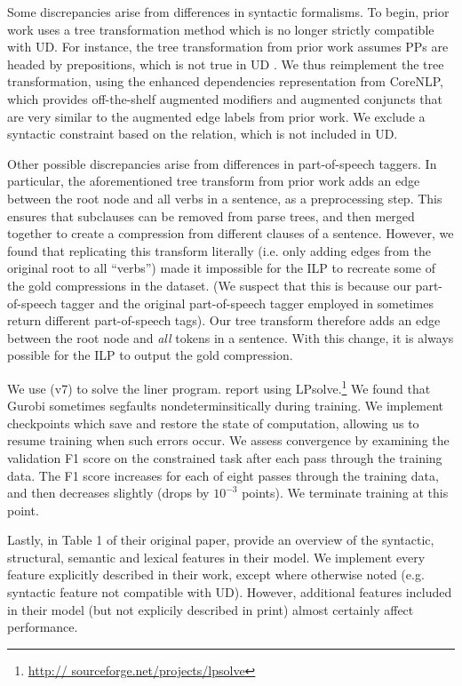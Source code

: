 Some discrepancies arise from differences in syntactic formalisms. To begin, prior work uses a tree transformation method which is no longer strictly compatible with UD. For instance, the tree transformation from prior work assumes PPs are headed by prepositions, which is not true in UD \cite{Schuster2016EnhancedEU}. We thus reimplement the tree transformation, using the enhanced dependencies representation from CoreNLP, which provides off-the-shelf augmented modifiers and augmented conjuncts that are very similar to the augmented edge labels from prior work. We exclude a syntactic constraint based on the  relation, which is not included in UD.

Other possible discrepancies arise from differences in part-of-speech taggers. In particular, the aforementioned tree transform from prior work adds an edge between the root node and all verbs in a sentence, as a preprocessing step. This ensures that subclauses can be removed from parse trees, and then merged together to create a compression from different clauses of a sentence. However, we found that replicating this transform literally (i.e. only adding edges from the original root to all ``verbs'') made it impossible for the ILP to recreate some of the gold compressions in the dataset. (We suspect that this is because our part-of-speech tagger and the original part-of-speech tagger employed in \citet{filippova2013overcoming} sometimes return different part-of-speech tags). Our tree transform therefore adds an edge between the root node and \textit{all} tokens in a sentence. With this change, it is always possible for the ILP to output the gold compression.

We use \citet{gurobi} (v7) to solve the liner program. \citet{filippova2008dependency} report using LPsolve.\footnote{\url{http://
sourceforge.net/projects/lpsolve}}  We found that Gurobi sometimes segfaults nondeterminsitically during training. We implement checkpoints which save and restore the state of computation, allowing us to resume training when such errors occur.  We assess convergence by examining the validation F1 score on the constrained task after each pass through the training data. The F1 score increases for each of eight passes through the training data, and then decreases slightly (drops by $10^{-3}$ points). We terminate training at this point. 


Lastly, in Table 1 of their original paper, \citet{filippova2013overcoming} provide an overview of the syntactic, structural, semantic and lexical features in their model. We implement every feature explicitly described in their work, except where otherwise noted (e.g. syntactic feature not compatible with UD). However, additional features included in their model (but not explicily described in print) almost certainly affect performance. 

